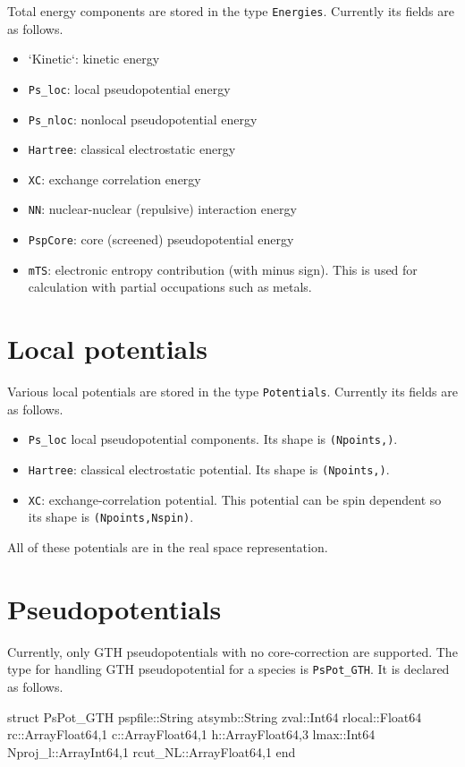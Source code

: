 \documentclass[a4paper,10pt]{paper}
\newcommand{\jlcode}[1]{\texttt{#1}}
\begin{document}
Total energy components are stored in the type \jlcode{Energies}. Currently its
fields are as follows.
\begin{itemize}
%
\item `Kinetic`: kinetic energy
%
\item \jlcode{Ps_loc}: local pseudopotential energy
%
\item \jlcode{Ps_nloc}: nonlocal pseudopotential energy
%
\item \jlcode{Hartree}: classical electrostatic energy
%
\item \jlcode{XC}: exchange correlation energy
%
\item \jlcode{NN}: nuclear-nuclear (repulsive) interaction energy
%
\item \jlcode{PspCore}: core (screened) pseudopotential energy
%
\item \jlcode{mTS}: electronic entropy contribution (with minus sign). This is
  used for calculation with partial occupations such as metals.
%
\end{itemize}


\section{Local potentials}

Various local potentials are stored in the type \jlcode{Potentials}. Currently
its fields are as follows.
\begin{itemize}
%
\item \jlcode{Ps_loc} local pseudopotential components.
  Its shape is \jlcode{(Npoints,)}.
%
\item \jlcode{Hartree}: classical electrostatic potential.
  Its shape is \jlcode{(Npoints,)}.
%
\item \jlcode{XC}: exchange-correlation potential. This potential can be spin
  dependent so its shape is \jlcode{(Npoints,Nspin)}.
%
\end{itemize}

All of these potentials are in the real space representation.


\section{Pseudopotentials}

Currently, only GTH pseudopotentials with no core-correction are supported.
The type for handling GTH pseudopotential for a species is \jlcode{PsPot_GTH}.
It is declared as follows.

\begin{juliacode}
struct PsPot_GTH
    pspfile::String
    atsymb::String
    zval::Int64
    rlocal::Float64
    rc::Array{Float64,1}
    c::Array{Float64,1}
    h::Array{Float64,3}
    lmax::Int64
    Nproj_l::Array{Int64,1}
    rcut_NL::Array{Float64,1}
end
\end{juliacode}
\end{document}
